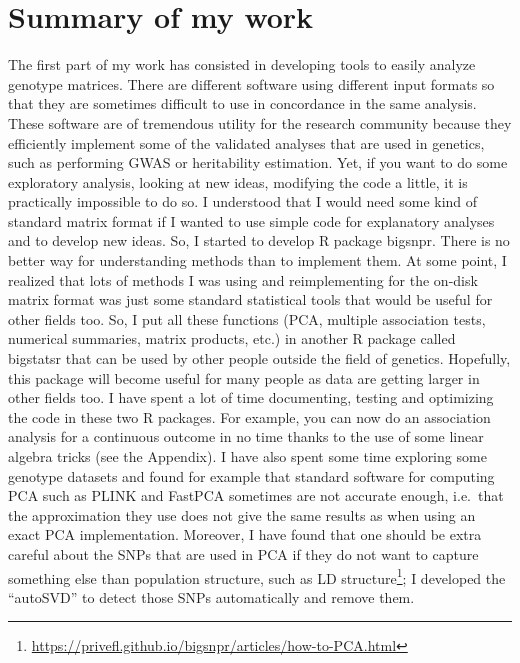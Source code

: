 \section{Summary of my work}

The first part of my work has consisted in developing tools to easily analyze genotype matrices.
There are different software using different input formats so that they are sometimes difficult to use in concordance in the same analysis.
These software are of tremendous utility for the research community because they efficiently implement some of the validated analyses that are used in genetics, such as performing GWAS or heritability estimation.
Yet, if you want to do some exploratory analysis, looking at new ideas, modifying the code a little, it is practically impossible to do so.
I understood that I would need some kind of standard matrix format if I wanted to use simple code for explanatory analyses and to develop new ideas.
So, I started to develop R package bigsnpr. There is no better way for understanding methods than to implement them. 
At some point, I realized that lots of methods I was using and reimplementing for the on-disk matrix format was just some standard statistical tools that would be useful for other fields too. 
So, I put all these functions (PCA, multiple association tests, numerical summaries, matrix products, etc.) in another R package called bigstatsr that can be used by other people outside the field of genetics. 
Hopefully, this package will become useful for many people as data are getting larger in other fields too. 
I have spent a lot of time documenting, testing and optimizing the code in these two R packages. 
For example, you can now do an association analysis for a continuous outcome in no time thanks to the use of some linear algebra tricks (see the Appendix).
I have also spent some time exploring some genotype datasets and found for example that standard software for computing PCA such as PLINK and FastPCA sometimes are not accurate enough, i.e.\ that the approximation they use does not give the same results as when using an exact PCA implementation. Moreover, I have found that one should be extra careful about the SNPs that are used in PCA if they do not want to capture something else than population structure, such as LD structure\footnote{\url{https://privefl.github.io/bigsnpr/articles/how-to-PCA.html}}; I developed the ``autoSVD'' to detect those SNPs automatically and remove them.

